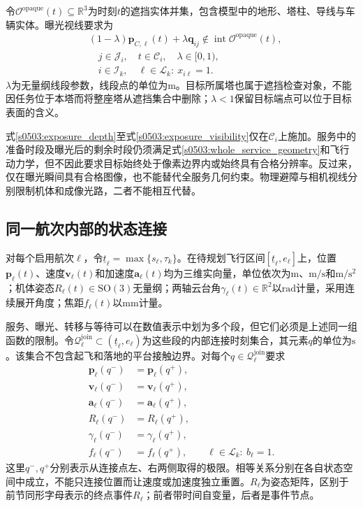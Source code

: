 令$\mathcal O^{\mathrm{opaque}}(t)\subseteq\mathbb R^3$为时刻$t$的遮挡实体并集，包含模型中的地形、塔柱、导线与车辆实体。曝光视线要求为
\begin{equation}
 \begin{split}
 &(1-\lambda)\mathbf p_{C,\ell}(t)
       +\lambda\mathbf q_{ij}
       \notin\operatorname{int}\mathcal O^{\mathrm{opaque}}(t),\\
 &\quad j\in\mathcal J_i,\quad t\in\mathcal C_i,
       \quad\lambda\in[0,1),\\
 &\quad i\in\mathcal I_k,\quad\ell\in\mathcal L_k:
       \ x_{i\ell}=1.
 \end{split}
 \label{s0503:exposure_visibility}
\end{equation}
$\lambda$为无量纲线段参数，线段点的单位为$\mathrm m$。目标所属塔也属于遮挡检查对象，不能因任务位于本塔而将整座塔从遮挡集合中删除；$\lambda<1$保留目标端点可以位于目标表面的含义。

式\eqref{s0503:exposure_depth}至式\eqref{s0503:exposure_visibility}仅在$\mathcal C_i$上施加。服务中的准备时段及曝光后的剩余时段仍须满足式\eqref{s0503:whole_service_geometry}和飞行动力学，但不因此要求目标始终处于像素边界内或始终具有合格分辨率。反过来，仅在曝光瞬间具有合格图像，也不能替代全服务几何约束。物理避障与相机视线分别限制机体和成像光路，二者不能相互代替。

\subsection{同一航次内部的状态连接}

对每个启用航次$\ell$，令$\underline t_\ell=\max\{s_\ell,\tau_k\}$。在待规划飞行区间$[\underline t_\ell,e_\ell]$上，位置$\mathbf p_\ell(t)$、速度$\mathbf v_\ell(t)$和加速度$\mathbf a_\ell(t)$均为三维实向量，单位依次为$\mathrm m$、$\mathrm{m/s}$和$\mathrm{m/s^2}$；机体姿态$R_\ell(t)\in\mathrm{SO}(3)$无量纲；两轴云台角$\gamma_\ell(t)\in\mathbb R^2$以$\mathrm{rad}$计量，采用连续展开角度；焦距$f_\ell(t)$以$\mathrm{mm}$计量。

服务、曝光、转移与等待可以在数值表示中划为多个段，但它们必须是上述同一组函数的限制。令$\mathcal Q_\ell^{\mathrm{join}}\subset(\underline t_\ell,e_\ell)$为这些段的内部连接时刻集合，其元素$q$的单位为$\mathrm{s}$。该集合不包含起飞和落地的平台接触边界。对每个$q\in\mathcal Q_\ell^{\mathrm{join}}$要求
\begin{align}
 \mathbf p_\ell(q^-)&=\mathbf p_\ell(q^+),
 \label{s0503:join_position}\\
 \mathbf v_\ell(q^-)&=\mathbf v_\ell(q^+),
 \label{s0503:join_velocity}\\
 \mathbf a_\ell(q^-)&=\mathbf a_\ell(q^+),
 \label{s0503:join_acceleration}\\
 R_\ell(q^-)&=R_\ell(q^+),
 \label{s0503:join_attitude}\\
 \gamma_\ell(q^-)&=\gamma_\ell(q^+),
 \label{s0503:join_gimbal}\\
 f_\ell(q^-)&=f_\ell(q^+),
 \qquad\ell\in\mathcal L_k:\ b_\ell=1.
 \label{s0503:join_focal}
\end{align}
这里$q^-,q^+$分别表示从连接点左、右两侧取得的极限。相等关系分别在各自状态空间中成立，不能只连接位置而让速度或加速度独立重置。$R_\ell$为姿态矩阵，区别于前节同形字母表示的终点事件$R_\ell$；前者带时间自变量，后者是事件节点。

